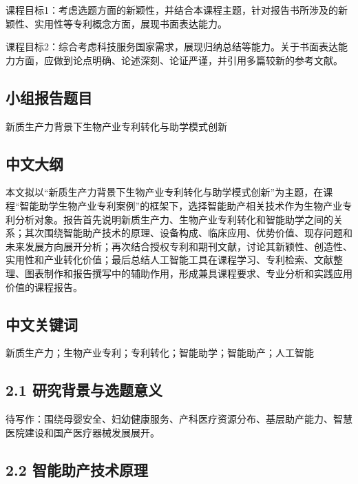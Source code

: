 \documentclass[UTF8,zihao=-4]{ctexart}
\begin{document}
课程目标1：考虑选题方面的新颖性，并结合本课程主题，针对报告书所涉及的新颖性、实用性等专利概念方面，展现书面表达能力。

课程目标2：综合考虑科技服务国家需求，展现归纳总结等能力。关于书面表达能力方面，应做到论点明确、论述深刻、论证严谨，并引用多篇较新的参考文献。

\subsection*{小组报告题目}

新质生产力背景下生物产业专利转化与助学模式创新

\subsection*{中文大纲}

本文拟以“新质生产力背景下生物产业专利转化与助学模式创新”为主题，在课程“智能助学生物产业专利案例”的框架下，选择智能助产相关技术作为生物产业专利分析对象。报告首先说明新质生产力、生物产业专利转化和智能助学之间的关系；其次围绕智能助产技术的原理、设备构成、临床应用、优势价值、现存问题和未来发展方向展开分析；再次结合授权专利和期刊文献，讨论其新颖性、创造性、实用性和产业转化价值；最后总结人工智能工具在课程学习、专利检索、文献整理、图表制作和报告撰写中的辅助作用，形成兼具课程要求、专业分析和实践应用价值的课程报告。

\subsection*{中文关键词}

新质生产力；生物产业专利；专利转化；智能助学；智能助产；人工智能

\subsection*{2.1 研究背景与选题意义}

待写作：围绕母婴安全、妇幼健康服务、产科医疗资源分布、基层助产能力、智慧医院建设和国产医疗器械发展展开。

\subsection*{2.2 智能助产技术原理}
\end{document}

